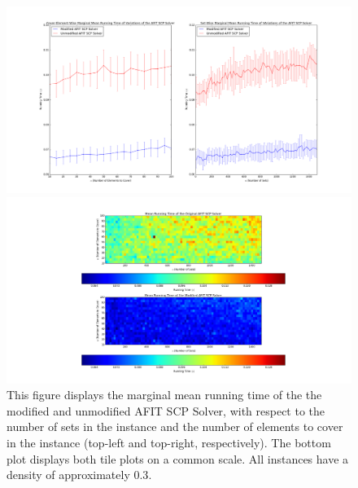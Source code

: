 \documentclass[12pt]{article}
\begin{document}
	\begin{figure}[ht!]\label{fig:runtime_analysis_comparitive_density0p3}
		\centering
		
		\begin{minipage}[b]{0.5\linewidth}
			\centering
			\centerline{\includegraphics[width =7in]{running_time_common_line_plots.png}}
		\end{minipage}
		\vfill
		\begin{minipage}[b]{0.5\linewidth}
			\centering
			\centerline{\includegraphics[width = 6in]{running_time_common_tile_plots.png}}
		\end{minipage}
		
		
		\caption{This figure displays the marginal mean running time of the the modified and unmodified AFIT SCP Solver, with respect to the number of sets in the instance and the number of elements to cover in the instance (top-left and top-right, respectively). The bottom plot displays both tile plots on a common scale. All instances have a density of approximately $0.3$.}
		
	\end{figure}
		
\end{document}
